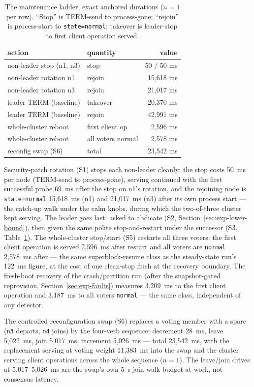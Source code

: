 \documentclass[10pt,journal,letterpaper]{IEEEtran}
\newcommand{\code}[1]{\texttt{\small #1}}
\begin{document}
\begin{table}[t]
\centering\small
\caption{The maintenance ladder, exact anchored durations ($n=1$ per
row). ``Stop'' is TERM-send to process-gone; ``rejoin'' is process-start
to \code{state=normal}; takeover is leader-stop to first client operation
served.}
\label{tab:maintenance}
\begin{tabular}{llr}
\toprule
action & quantity & value \\
\midrule
non-leader stop (n1, n3) & stop & 50 / 50 ms \\
non-leader rotation n1 & rejoin & 15{,}618 ms \\
non-leader rotation n3 & rejoin & 21{,}017 ms \\
leader TERM (baseline) & takeover & 20{,}370 ms \\
leader TERM (baseline) & rejoin & 42{,}991 ms \\
whole-cluster reboot & first client op & 2{,}596 ms \\
whole-cluster reboot & all voters normal & 2{,}578 ms \\
reconfig swap (S6) & total & 23{,}542 ms \\
\bottomrule
\end{tabular}
\end{table}

Security-patch rotation (S1) stops each non-leader cleanly: the stop costs
50~ms per node (TERM-send to process-gone), serving continued with the
first successful probe 69~ms after the stop on n1's rotation, and the
rejoining node is \code{state=normal} 15{,}618~ms (n1) and 21{,}017~ms
(n3) after its own process start --- the catch-up walk under the calm
knobs, during which the two-of-three cluster kept serving. The leader goes
last: asked to abdicate (S2, Section~\ref{sec:exp-lower-bound}), then
given the same polite stop-and-restart under the successor (S3,
Table~\ref{tab:maintenance}). The whole-cluster stop/start (S5) restarts
all three voters: the first client operation is served 2{,}596~ms after
restart and all voters are \code{normal} 2{,}578~ms after --- the same
superblock-resume class as the steady-state run's 122~ms figure, at the
cost of one clean-stop flush at the recovery boundary. The fresh-boot
recovery of the crash/partition run (after the snapshot-gated reprovision,
Section~\ref{sec:exp-faults}) measures 3,209~ms to the first client
operation and 3,187~ms to all voters \code{normal} --- the same class,
independent of any detector.

The controlled reconfiguration swap (S6) replaces a voting member with a
spare (\code{n3} departs, \code{n4} joins) by the four-verb sequence:
decrement 28~ms, leave 5,022~ms, join 5,017~ms, increment 5,026~ms ---
total 23,542~ms, with the replacement serving at voting weight 11,383~ms
into the swap and the cluster serving client operations across the whole
sequence ($n=1$). The leave/join drives at 5,017--5,026~ms are the swap's
own 5~s join-walk budget at work, not consensus latency.
\end{document}
